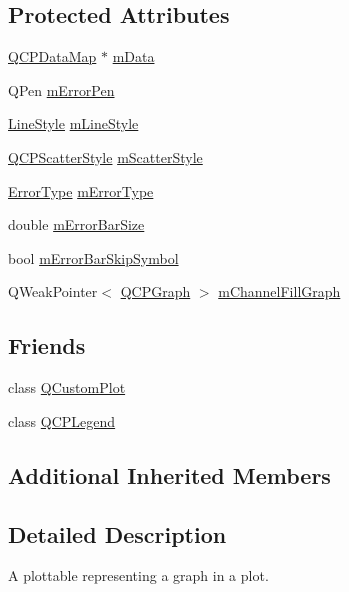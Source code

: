 \subsection*{Protected Attributes}
\begin{DoxyCompactItemize}
\item 
\hyperlink{qcustomplot_8h_a84a9c4a4c2216ccfdcb5f3067cda76e3}{Q\-C\-P\-Data\-Map} $\ast$ \hyperlink{class_q_c_p_graph_a8457c840f69a0ac49f61d30a509c5d08}{m\-Data}
\item 
Q\-Pen \hyperlink{class_q_c_p_graph_aa35681a24165c2831301091a87b662ce}{m\-Error\-Pen}
\item 
\hyperlink{class_q_c_p_graph_ad60175cd9b5cac937c5ee685c32c0859}{Line\-Style} \hyperlink{class_q_c_p_graph_a8604fd98402035a63375849f7341ee25}{m\-Line\-Style}
\item 
\hyperlink{class_q_c_p_scatter_style}{Q\-C\-P\-Scatter\-Style} \hyperlink{class_q_c_p_graph_a4aa36241f166ccd1f75fc8f24e4a3247}{m\-Scatter\-Style}
\item 
\hyperlink{class_q_c_p_graph_ad23b514404bd2cb3216f57c90904d6af}{Error\-Type} \hyperlink{class_q_c_p_graph_a29e64273db201aeadebc61c870720a36}{m\-Error\-Type}
\item 
double \hyperlink{class_q_c_p_graph_a7b51c8d09510f9d195b5e765ccbcf05b}{m\-Error\-Bar\-Size}
\item 
bool \hyperlink{class_q_c_p_graph_acf631d7dbd1055a69ab3b63094868557}{m\-Error\-Bar\-Skip\-Symbol}
\item 
Q\-Weak\-Pointer$<$ \hyperlink{class_q_c_p_graph}{Q\-C\-P\-Graph} $>$ \hyperlink{class_q_c_p_graph_af307480bd1fa5bc54160c74419bc5482}{m\-Channel\-Fill\-Graph}
\end{DoxyCompactItemize}
\subsection*{Friends}
\begin{DoxyCompactItemize}
\item 
class \hyperlink{class_q_c_p_graph_a1cdf9df76adcfae45261690aa0ca2198}{Q\-Custom\-Plot}
\item 
class \hyperlink{class_q_c_p_graph_a8429035e7adfbd7f05805a6530ad5e3b}{Q\-C\-P\-Legend}
\end{DoxyCompactItemize}
\subsection*{Additional Inherited Members}


\subsection{Detailed Description}
A plottable representing a graph in a plot. 



